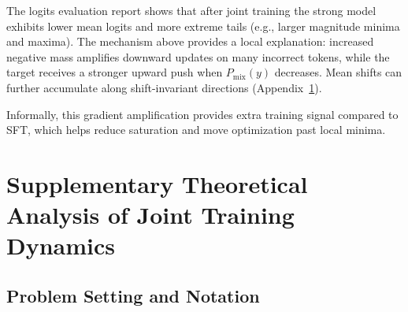 \begin{remark}
The logits evaluation report shows that after joint training the strong model exhibits lower mean logits and more extreme tails (e.g., larger magnitude minima and maxima). The mechanism above provides a local explanation: increased negative mass amplifies downward updates on many incorrect tokens, while the target receives a stronger upward push when $P_{\mathrm{mix}}(y)$ decreases. Mean shifts can further accumulate along shift-invariant directions (Appendix~\ref{sec:appendix_joint_theory}).
\end{remark}
Informally, this gradient amplification provides extra training signal compared to SFT, which helps reduce saturation and move optimization past local minima.







\newpage
\section{Supplementary Theoretical Analysis of Joint Training Dynamics}
\label{sec:appendix_joint_theory}

\subsection{Problem Setting and Notation}
